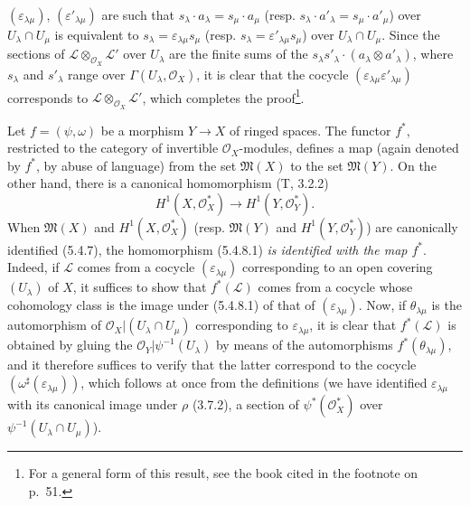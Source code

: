 \begin{env}[5.4.7]
$(\varepsilon_{\lambda\mu})$, $(\varepsilon'_{\lambda\mu})$ are such that
$s_\lambda\cdot a_\lambda=s_\mu\cdot a_\mu$ (resp.
$s_\lambda\cdot a'_\lambda=s_\mu\cdot a'_\mu$) over
$U_\lambda\cap U_\mu$ is equivalent to
$s_\lambda=\varepsilon_{\lambda\mu}s_\mu$ (resp.
$s_\lambda=\varepsilon'_{\lambda\mu}s_\mu$) over
$U_\lambda\cap U_\mu$. Since the sections of
$\mathcal{L}\otimes_{\mathcal{O}_X}\mathcal{L}'$ over $U_\lambda$
are the finite sums of the
$s_\lambda s'_\lambda\cdot(a_\lambda\otimes a'_\lambda)$, where $s_\lambda$ and
$s'_\lambda$ range over $\Gamma(U_\lambda,\mathcal{O}_X)$, it is clear that
the cocycle $(\varepsilon_{\lambda\mu}\varepsilon'_{\lambda\mu})$ corresponds
to $\mathcal{L}\otimes_{\mathcal{O}_X}\mathcal{L}'$, which completes the
proof\footnote{For a general form of this result, see the book
cited in the footnote on p.~51.}.
\end{env}

\begin{env}[5.4.8]
\label{0.5.4.8}
Let $f=(\psi,\omega)$ be a morphism $Y\to X$ of ringed spaces. The functor
$f^*$, restricted to the category of invertible $\mathcal{O}_X$-modules,
defines a map (again denoted by $f^*$, by abuse of language) from the set
$\mathfrak{M}(X)$ to the set $\mathfrak{M}(Y)$. On the other hand, there is a
canonical homomorphism (T, 3.2.2)
\[
  H^1(X,\mathcal{O}_X^*)\longrightarrow H^1(Y,\mathcal{O}_Y^*).
  \tag{5.4.8.1}\label{0.5.4.8.1}
\]
When $\mathfrak{M}(X)$ and
$H^1(X,\mathcal{O}_X^*)$ (resp. $\mathfrak{M}(Y)$ and
$H^1(Y,\mathcal{O}_Y^*)$) are canonically identified (5.4.7), the homomorphism (5.4.8.1) \emph{is identified with
the map $f^*$}. Indeed, if $\mathcal{L}$ comes from a cocycle
$(\varepsilon_{\lambda\mu})$ corresponding to an open covering
$(U_\lambda)$ of $X$, it suffices to show that $f^*(\mathcal{L})$ comes
from a cocycle whose cohomology class is the image under (5.4.8.1) of that of
$(\varepsilon_{\lambda\mu})$. Now, if $\theta_{\lambda\mu}$ is
the automorphism of $\mathcal{O}_X|(U_\lambda\cap U_\mu)$ corresponding to
$\varepsilon_{\lambda\mu}$, it is clear that $f^*(\mathcal{L})$ is obtained by
gluing the $\mathcal{O}_Y|\psi^{-1}(U_\lambda)$ by means of the
automorphisms $f^*(\theta_{\lambda\mu})$, and it therefore suffices to verify that
the latter correspond to the cocycle
$(\omega^\sharp(\varepsilon_{\lambda\mu}))$, which follows at once from the
definitions (we have identified $\varepsilon_{\lambda\mu}$ with its canonical image
under $\rho$ (3.7.2), a section of $\psi^*(\mathcal{O}_X^*)$ over
$\psi^{-1}(U_\lambda\cap U_\mu)$).
\end{env}

